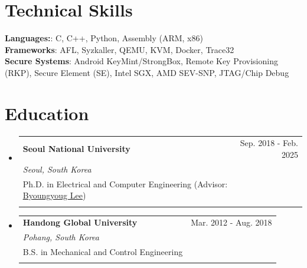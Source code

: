 \documentclass[letterpaper,11pt]{article}
\makeatletter
\newcommand{\resumeSubheading}[5]{
  \vspace{-2pt}\item
    \begin{tabular*}{0.97\textwidth}[t]{l@{\extracolsep{\fill}}r}
      \textbf{#1} & #2 \\ \vspace{5pt}
      \textit{\small#3} & \textit{\small #4} \\ 
      #5 \\ \vspace{4pt}
    \end{tabular*}\vspace{-7pt}
}
\newcommand{\resumeSubHeadingListStart}{\begin{itemize}[leftmargin=0.15in, label={}, itemsep=6pt, parsep=0pt, topsep=2pt]}
\newcommand{\resumeSubHeadingListEnd}{\end{itemize}}
\makeatother
\begin{document}
%
\section{Technical Skills}
 \begin{itemize}[leftmargin=0.15in, label={}]
    {\item{
     \textbf{Languages:}{: C, C++, Python, Assembly (ARM, x86)} \\
     \textbf{Frameworks}{: AFL, Syzkaller, QEMU, KVM, Docker, Trace32} \\
     \textbf{Secure Systems}{: Android KeyMint/StrongBox, Remote Key Provisioning (RKP), Secure Element (SE), Intel SGX, AMD SEV-SNP, JTAG/Chip Debug} \\
    }}
\end{itemize}

\section{Education}
  \resumeSubHeadingListStart
    \resumeSubheading
        {Seoul National University}{Sep. 2018 - Feb. 2025}
        {Seoul, South Korea}{}
        {Ph.D. in Electrical and Computer Engineering (Advisor: \href{https://lifeasageek.github.io/}{\underline{Byoungyoug Lee}})}
        \vspace{-1em}

    \resumeSubheading
      {Handong Global University}{Mar. 2012 - Aug. 2018}
      {Pohang, South Korea}{}
      {B.S. in Mechanical and Control Engineering}
  \resumeSubHeadingListEnd

\end{document}
